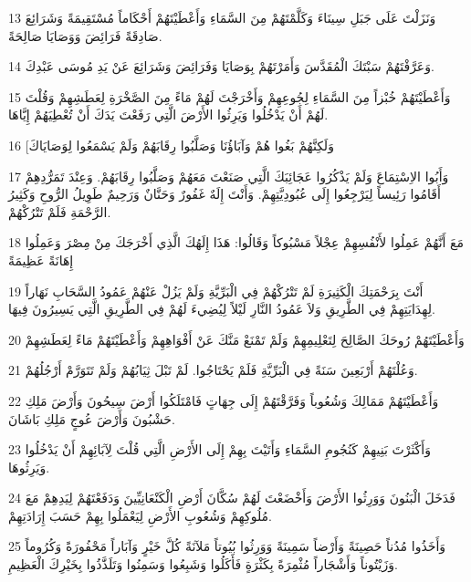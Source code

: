 \par 13 وَنَزَلْتَ عَلَى جَبَلِ سِينَاءَ وَكَلَّمْتَهُمْ مِنَ السَّمَاءِ وَأَعْطَيْتَهُمْ أَحْكَاماً مُسْتَقِيمَةً وَشَرَائِعَ صَادِقَةً فَرَائِضَ وَوَصَايَا صَالِحَةً.
\par 14 وَعَرَّفْتَهُمْ سَبْتَكَ الْمُقَدَّسَ وَأَمَرْتَهُمْ بِوَصَايَا وَفَرَائِضَ وَشَرَائِعَ عَنْ يَدِ مُوسَى عَبْدِكَ.
\par 15 وَأَعْطَيْتَهُمْ خُبْزاً مِنَ السَّمَاءِ لِجُوعِهِمْ وَأَخْرَجْتَ لَهُمْ مَاءً مِنَ الصَّخْرَةِ لِعَطَشِهِمْ وَقُلْتَ لَهُمْ أَنْ يَدْخُلُوا وَيَرِثُوا الأَرْضَ الَّتِي رَفَعْتَ يَدَكَ أَنْ تُعْطِيَهُمْ إِيَّاهَا.
\par 16 [وَلَكِنَّهُمْ بَغُوا هُمْ وَآبَاؤُنَا وَصَلَّبُوا رِقَابَهُمْ وَلَمْ يَسْمَعُوا لِوَصَايَاكَ
\par 17 وَأَبُوا الاِسْتِمَاعَ وَلَمْ يَذْكُرُوا عَجَائِبَكَ الَّتِي صَنَعْتَ مَعَهُمْ وَصَلَّبُوا رِقَابَهُمْ. وَعِنْدَ تَمَرُّدِهِمْ أَقَامُوا رَئِيساً لِيَرْجِعُوا إِلَى عُبُودِيَّتِهِمْ. وَأَنْتَ إِلَهٌ غَفُورٌ وَحَنَّانٌ وَرَحِيمٌ طَوِيلُ الرُّوحِ وَكَثِيرُ الرَّحْمَةِ فَلَمْ تَتْرُكْهُمْ.
\par 18 مَعَ أَنَّهُمْ عَمِلُوا لأَنْفُسِهِمْ عِجْلاً مَسْبُوكاً وَقَالُوا: هَذَا إِلَهُكَ الَّذِي أَخْرَجَكَ مِنْ مِصْرَ وَعَمِلُوا إِهَانَةً عَظِيمَةً
\par 19 أَنْتَ بِرَحْمَتِكَ الْكَثِيرَةِ لَمْ تَتْرُكْهُمْ فِي الْبَرِّيَّةِ وَلَمْ يَزُلْ عَنْهُمْ عَمُودُ السَّحَابِ نَهَاراً لِهِدَايَتِهِمْ فِي الطَّرِيقِ وَلاَ عَمُودُ النَّارِ لَيْلاً لِيُضِيءَ لَهُمْ فِي الطَّرِيقِ الَّتِي يَسِيرُونَ فِيهَا.
\par 20 وَأَعْطَيْتَهُمْ رُوحَكَ الصَّالِحَ لِتَعْلِيمِهِمْ وَلَمْ تَمْنَعْ مَنَّكَ عَنْ أَفْوَاهِهِمْ وَأَعْطَيْتَهُمْ مَاءً لِعَطَشِهِمْ
\par 21 وَعُلْتَهُمْ أَرْبَعِينَ سَنَةً فِي الْبَرِّيَّةِ فَلَمْ يَحْتَاجُوا. لَمْ تَبْلَ ثِيَابُهُمْ وَلَمْ تَتَوَرَّمْ أَرْجُلُهُمْ.
\par 22 وَأَعْطَيْتَهُمْ مَمَالِكَ وَشُعُوباً وَفَرَّقْتَهُمْ إِلَى جِهَاتٍ فَامْتَلَكُوا أَرْضَ سِيحُونَ وَأَرْضَ مَلِكِ حَشْبُونَ وَأَرْضَ عُوجٍ مَلِكِ بَاشَانَ.
\par 23 وَأَكْثَرْتَ بَنِيهِمْ كَنُجُومِ السَّمَاءِ وَأَتَيْتَ بِهِمْ إِلَى الأَرْضِ الَّتِي قُلْتَ لِآبَائِهِمْ أَنْ يَدْخُلُوا وَيَرِثُوهَا.
\par 24 فَدَخَلَ الْبَنُونَ وَوَرِثُوا الأَرْضَ وَأَخْضَعْتَ لَهُمْ سُكَّانَ أَرْضِ الْكَنْعَانِيِّينَ وَدَفَعْتَهُمْ لِيَدِهِمْ مَعَ مُلُوكِهِمْ وَشُعُوبِ الأَرْضِ لِيَعْمَلُوا بِهِمْ حَسَبَ إِرَادَتِهِمْ.
\par 25 وَأَخَذُوا مُدُناً حَصِينَةً وَأَرْضاً سَمِينَةً وَوَرِثُوا بُيُوتاً مَلآنَةً كُلَّ خَيْرٍ وَآبَاراً مَحْفُورَةً وَكُرُوماً وَزَيْتُوناً وَأَشْجَاراً مُثْمِرَةً بِكَثْرَةٍ فَأَكَلُوا وَشَبِعُوا وَسَمِنُوا وَتَلَذَّذُوا بِخَيْرِكَ الْعَظِيمِ.
